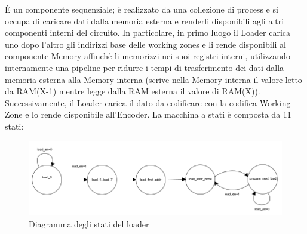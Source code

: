 \documentclass[10pt,english, openany]{book}
\begin{document}
È un componente sequenziale; è realizzato da una collezione di process e si occupa di caricare dati dalla memoria esterna e renderli disponibili agli altri componenti interni del circuito. In particolare, in primo luogo il Loader carica uno dopo l’altro gli indirizzi base delle working zones e li rende disponibili al componente Memory affinchè li memorizzi nei suoi registri interni, utilizzando internamente una pipeline per ridurre i tempi di trasferimento dei dati dalla memoria esterna alla Memory interna (scrive nella Memory interna il valore letto da RAM(X-1) mentre legge dalla RAM esterna il valore di RAM(X)). Successivamente, il Loader carica il dato da codificare con la codifica Working Zone e lo rende disponibile all’Encoder. La macchina a stati è composta da 11 stati:
\begin{figure}[h!]
    \centering
    \includegraphics[scale=0.9]{stati_loader.png}
    \caption{Diagramma degli stati del loader}
    \label{fig:stati_loader}
\end{figure}{}
\end{document}
